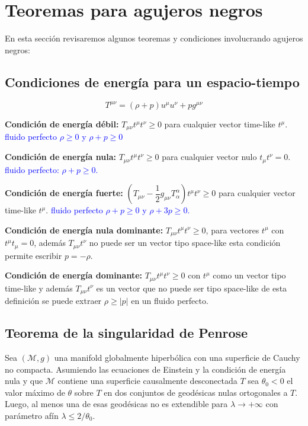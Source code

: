 \documentclass[../main]{subfiles}
\begin{document}
\section{Teoremas para agujeros negros}

En esta sección revisaremos algunos teoremas y condiciones involucrando agujeros negros:

\subsection{Condiciones de energía para un espacio-tiempo}
\begin{equation}
    T^{\mu\nu}=(\rho+p)u^{\mu}u^{\nu}+pg^{\mu\nu}
\end{equation}

\textbf{Condición de energía débil:} $T_{\mu\nu}t^{\mu}t^{\nu}\geq 0$ para cualquier vector time-like $t^{\mu}$. \textcolor{blue}{fluido perfecto $\rho\geq 0$ y $\rho+p\geq 0$}

\textbf{Condición de energía nula:} $T_{\mu\nu}t^{\mu}t^{\nu}\geq 0$ para cualquier vector nulo $t_{\mu}t^{\nu}=0$. \textcolor{blue}{fluido perfecto: $\rho+p\geq 0$.}

\textbf{Condición de energía fuerte:} $\displaystyle \left(T_{\mu\nu}-\dfrac{1}{2}g_{\mu\nu}T^{\alpha}_{\alpha}\right)t^{\mu} t^{\nu} \geq 0$ para cualquier vector time-like $t^{\mu}$. \textcolor{blue}{fluido perfecto $\rho+p\geq 0$ y $\rho+3p\geq 0$.}

\textbf{Condición de energía nula dominante:} $T_{\mu\nu}t^{\mu}t^{\nu}\geq 0$, para vectores $t^{\mu}$ con $t^{\mu}t_{\mu}=0$, además $T_{\mu\nu}t^{\nu}$ no puede ser un vector tipo space-like esta condición permite escribir $p=-\rho$.

\textbf{Condición de energía dominante:} $T_{\mu\nu}t^{\mu}t^{\nu}\geq 0$ con $t^{\mu}$ como un vector tipo time-like y además $T_{\mu\nu}t^{\nu}$ es un vector que no puede ser tipo space-like de esta definición se puede extraer $\rho \geq |p|$ en un fluido perfecto.

\subsection{Teorema de la singularidad de Penrose}

\teorema{} Sea $(\mathcal{M}, g)$ una manifold globalmente hiperbólica con una superficie de Cauchy no compacta. Asumiendo las ecuaciones de Einstein y la condición de energía nula y que $\mathcal{M}$ contiene una superficie causalmente desconectada $T$ sea $\theta_0<0$ el valor máximo de $\theta$ sobre $T$ en dos conjuntos de geodésicas nulas ortogonales a $T$. Luego, al menos una de esas geodésicas no es extendible para $\lambda \rightarrow + \infty$ con parámetro afín $\lambda \leq 2/\theta_0$.
\end{document}
